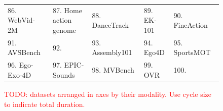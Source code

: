 \documentclass[smallextended,twocolumn,natbib]{svjour3}
\begin{document}
\begin{figure}[t]
{\begin{tabular}{lllll}
      86. WebVid-2M~\citep{bain2021frozen} &
      87. Home action genome~\citep{rai2021home} & 
      88. DanceTrack~\citep{sun2022dancetrack} &
      89. EK-101~\citep{damen2022rescaling} &
      90. FineAction~\citep{liu2022fineaction} \\
      91. AVSBench~\citep{zhou2022audio} &
      92. \citet{li2022neural} &
      93. Assembly101~\citep{sener2022assembly101} &
      94. Ego4D \citep{grauman2022ego4d} &
      95. SportsMOT~\citep{cui2023sportsmot} \\
      96. Ego-Exo-4D \citep{grauman2024ego} & 
      97. EPIC-Sounds \citep{huh2023epic} &
      98. MVBench \citep{li2024mvbench} &
      99. OVR \citep{dwibedi2024ovr} &
      100. \citet{yang2024vidchapters}
    \end{tabular}
    }
    \caption{\textcolor{red}{TODO: datasets arranged in axes by their modality. Use cycle size to indicate total duration.}}
\end{figure}
\end{document}
